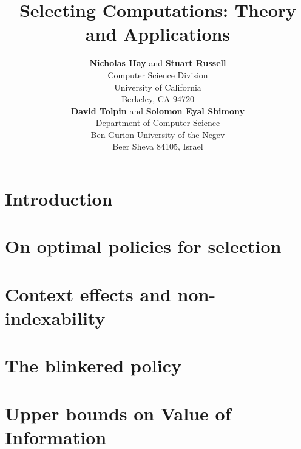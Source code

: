 \documentclass[]{article}
\title{Selecting Computations: Theory and Applications}
\author{ {\bf Nicholas Hay} and {\bf Stuart Russell} \\   
Computer Science Division \\  
University of California\\ 
Berkeley, CA 94720 \\ 
\And 
{\bf David Tolpin} and {\bf Solomon Eyal Shimony} \\ 
Department of Computer Science \\ 
Ben-Gurion University of the Negev\\
Beer Sheva 84105, Israel
}
\begin{document}
\maketitle 



\section{Introduction}




\section{On optimal policies for selection}\label{sec:optimal}




\section{Context effects and non-indexability}\label{sec:context}




\section{The blinkered policy}\label{sec:blinkered}\label{approx-bayesian-section}









  

\section{Upper bounds on Value of Information}\label{approx-nonbayesian-section}

\end{document}
